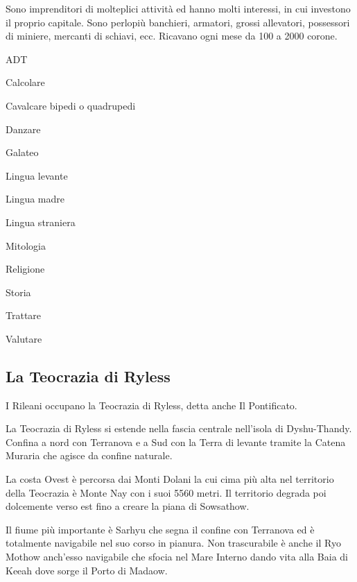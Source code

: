 
Sono imprenditori di molteplici attivit\`a ed hanno molti interessi,
in cui investono il proprio capitale. Sono perlopi\`u banchieri,
armatori, grossi allevatori, possessori di miniere, mercanti di
schiavi, ecc.  Ricavano ogni mese da 100 a 2000 corone.

\begin{abilist}
\item ADT 
\item Calcolare 
\item Cavalcare bipedi o quadrupedi 
\item Danzare 
\item Galateo 
\item Lingua levante 
\item Lingua madre 
\item Lingua straniera 
\item Mitologia 
\item Religione 
\item Storia 
\item Trattare 
\item Valutare
\end{abilist}


\iffullversion
\subsection{La Teocrazia di Ryless}


I Rileani occupano la Teocrazia di Ryless, detta anche Il Pontificato.

\Geografia La Teocrazia di Ryless si estende nella fascia centrale
nell'isola di Dyshu-Thandy. Confina a nord con Terranova e a Sud con
la Terra di levante tramite la Catena Muraria che agisce da confine
naturale. 

La costa Ovest \`e percorsa dai Monti Dolani la cui cima pi\`u alta
nel territorio della Teocrazia \`e Monte Nay con i suoi 5560 metri. Il
territorio degrada poi dolcemente verso est fino a creare la piana di
Sowsathow. 

Il fiume pi\`u importante \`e Sarhyu che segna il confine con
Terranova ed \`e totalmente navigabile nel suo corso in pianura.  Non
trascurabile \`e anche il Ryo Mothow anch'esso navigabile che sfocia
nel Mare Interno dando vita alla Baia di Keeah dove sorge il Porto di
Madaow.

